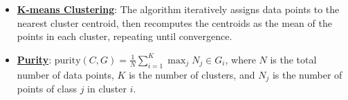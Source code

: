 \documentclass{article}%
\begin{document}
\begin{itemize}[leftmargin=*]
\item \href{https://purdue.brightspace.com/d2l/common/assets/pdfjs-d2l-dist/1.0.14-legacy/web/viewer.html?file=\%2Fcontent\%2Fenforced\%2F1095467-wl.202510.CS.24300.001\%2F12L2-distance-clusters.pdf\%3Fou\%3D1095467\&lang=en-us\&container=d2l-fileviewer-rendered-pdf\&fullscreen=d2l-fileviewer-rendered-pdf-dialog\&height=667#page=22}{\textbf{K-means Clustering}}: The algorithm iteratively assigns data points to the nearest cluster centroid, then recomputes the centroids as the mean of the points in each cluster, repeating until convergence.%
\item \href{https://purdue.brightspace.com/d2l/common/assets/pdfjs-d2l-dist/1.0.14-legacy/web/viewer.html?file=\%2Fcontent\%2Fenforced\%2F1095467-wl.202510.CS.24300.001\%2F12L2-distance-clusters.pdf\%3Fou\%3D1095467\&lang=en-us\&container=d2l-fileviewer-rendered-pdf\&fullscreen=d2l-fileviewer-rendered-pdf-dialog\&height=667#page=44}{\textbf{Purity}}: $\text{purity}(C, G) = \frac{1}{N} \sum_{i=1}^{K} \max_j N_j \in G_i$, where $N$ is the total number of data points, $K$ is the number of clusters, and $N_j$ is the number of points of class $j$ in cluster $i$.%
\end{itemize}

%
\end{document}
